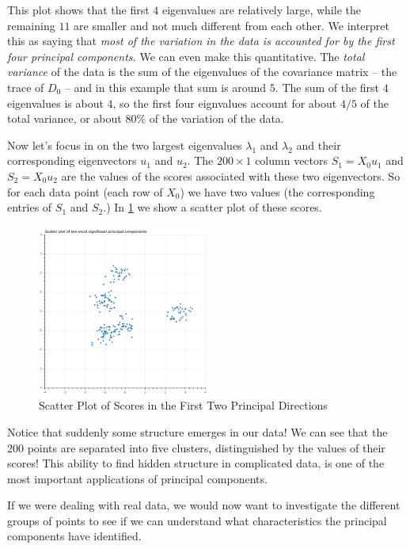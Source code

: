 \documentclass[
  oneside]{scrbook}
\begin{document}
This plot shows that the first \(4\) eigenvalues are relatively large,
while the remaining \(11\) are smaller and not much different from each
other. We interpret this as saying that \emph{most of the variation in
the data is accounted for by the first four principal components.} We
can even make this quantitative. The \emph{total variance} of the data
is the sum of the eigenvalues of the covariance matrix -- the trace of
\(D_{0}\) -- and in this example that sum is around \(5\). The sum of
the first \(4\) eigenvalues is about \(4\), so the first four eignvalues
account for about \(4/5\) of the total variance, or about \(80\%\) of
the variation of the data.

Now let's focus in on the two largest eigenvalues \(\lambda_{1}\) and
\(\lambda_{2}\) and their corresponding eigenvectors \(u_{1}\) and
\(u_{2}\). The \(200\times 1\) column vectors \(S_{1}=X_{0}u_{1}\) and
\(S_{2}=X_{0}u_{2}\) are the values of the scores associated with these
two eigenvectors. So for each data point (each row of \(X_{0}\)) we have
two values (the corresponding entries of \(S_{1}\) and \(S_{2}\).) In
\cref{fig:principalvalues} we show a scatter plot of these scores.

\begin{figure}
\hypertarget{fig:principalvalues}{%
\centering
\includegraphics[width=0.5\textwidth,height=\textheight]{img/pcadimred.png}
\caption{Scatter Plot of Scores in the First Two Principal
Directions}\label{fig:principalvalues}
}
\end{figure}

Notice that suddenly some structure emerges in our data! We can see that
the 200 points are separated into five clusters, distinguished by the
values of their scores! This ability to find hidden structure in
complicated data, is one of the most important applications of principal
components.

If we were dealing with real data, we would now want to investigate the
different groups of points to see if we can understand what
characteristics the principal components have identified.
\end{document}
